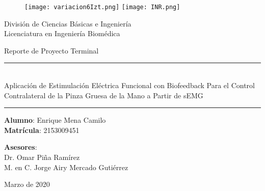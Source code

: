 \begin{titlepage}
\begin{center}

\begin{figure}
	\centering
	\texttt{[image: variacion6Izt.png]}
	\hfill
	\texttt{[image: INR.png]}
\end{figure}

\LARGE{División de Ciencias Básicas e Ingeniería\\Licenciatura en Ingeniería Biomédica\\}

\vspace*{\fill}
\LARGE{Reporte de Proyecto Terminal}

\vspace*{\fill}

\rule{15.5cm}{0.5mm}\\
\LARGE{Aplicación de Estimulación Eléctrica Funcional con Biofeedback Para el Control Contralateral de la Pinza Gruesa de la Mano a Partir de sEMG}\\
\rule{15.5cm}{0.5mm}

\vspace*{\fill}

\LARGE{	\textbf{Alumno}: Enrique Mena Camilo\\
		\textbf{Matrícula}: 2153009451\\}

\vspace*{\fill}

\LARGE{\textbf{Asesores}:\\Dr. Omar Piña Ramírez\\M. en C. Jorge Airy Mercado Gutiérrez}

\vspace*{\fill}

\Large{Marzo de 2020}

\end{center}
\end{titlepage}